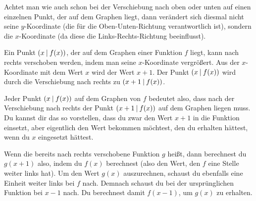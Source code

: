 \documentclass[../../main.tex]{subfiles}
\begin{document}
Achtet man wie auch schon bei der Verschiebung nach oben oder unten auf einen einzelnen Punkt, der auf dem Graphen liegt, dann verändert sich diesmal nicht seine $y$-Koordinate (die für die Oben-Unten-Richtung verantwortlich ist), sondern die $x$-Koordinate (da diese die Links-Rechts-Richtung beeinflusst).

\begin{center}
\end{center}

Ein Punkt $\left(x \:\middle|\: f(x)\right)$, der auf dem Graphen einer Funktion $f$ liegt, kann nach rechts verschoben werden, indem man seine $x$-Koordinate vergrößert. Aus der $x$-Koordinate mit dem Wert $x$ wird der Wert $x+1$. Der Punkt $\left(x \:\middle|\: f(x)\right)$ wird durch die Verschiebung nach rechts zu $\left(x+1 \:\middle|\: f(x)\right)$.

Jeder Punkt $\left(x \:\middle|\: f(x)\right)$ auf dem Graphen von $f$ bedeutet also, dass nach der Verschiebung nach rechts der Punkt $\left(x+1 \:\middle|\: f(x)\right)$ auf dem Graphen liegen muss. Du kannst dir das so vorstellen, dass du zwar den Wert $x+1$ in die Funktion einsetzt, aber eigentlich den Wert bekommen möchtest, den du erhalten hättest, wenn du $x$ eingesetzt hättest.

Wenn die bereits nach rechts verschobene Funktion $g$ heißt, dann berechnest du $g(x+1)$ also, indem du $f(x)$ berechnest (also den Wert, den $f$ eine Stelle weiter links hat). Um den Wert $g(x)$ auszurechnen, schaust du ebenfalls eine Einheit weiter links bei $f$ nach. Demnach schaust du bei der ursprünglichen Funktion bei $x-1$ nach. Du berechnest damit $f(x-1)$, um $g(x)$ zu erhalten.
\end{document}

